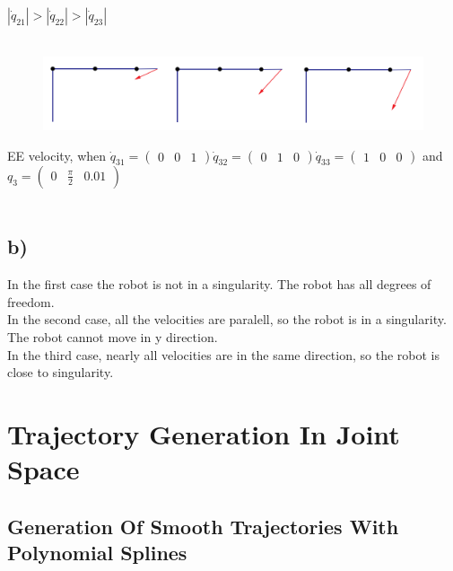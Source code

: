 \documentclass[a4paper,10pt]{article}
\begin{document}
$
| \dot{q}_{21} |>|\dot{q}_{22}|>|\dot{q}_{23}| 
$
\\~\\
\begin{figure}[H]
	\begin{center}
		\includegraphics[scale=0.3]{img/3_full.png}
	\end{center}
\end{figure}
EE velocity, when 
$
\dot{q}_{31} =
\begin{pmatrix}
0 & 0 & 1
\end{pmatrix}
\dot{q}_{32} =
\begin{pmatrix}
0 & 1 & 0
\end{pmatrix}
\dot{q}_{33} =
\begin{pmatrix}
1 & 0 & 0
\end{pmatrix}
$
and  
$
q_3=
\begin{pmatrix}
0 & \frac{\pi}{2} & 0.01
\end{pmatrix} 
$
\\~\\
\subsection*{b)}

In the first case the robot is not in a singularity. The robot has all degrees of freedom.\\

In the second case, all the velocities are paralell, so the robot is in a singularity. The robot cannot move in y direction.\\

In the third case, nearly all velocities are in the same direction, so the robot is close to singularity.
\newpage



\section{Trajectory Generation In Joint Space}

\subsection{Generation Of Smooth Trajectories With Polynomial Splines}
\end{document}
